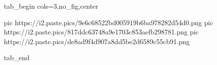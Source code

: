  
 
 
 
 


\ifcmt
  tab_begin cols=3,no_fig,center

     pic https://i2.paste.pics/9e6c68522bd005919b6ba978282d54d0.png
		 pic https://i2.paste.pics/817ddc63748a9e1703c853aefb298781.png
		 pic https://i2.paste.pics/de8ad9f4d907a8dd5be2d6589c55cb91.png

  tab_end
\fi
